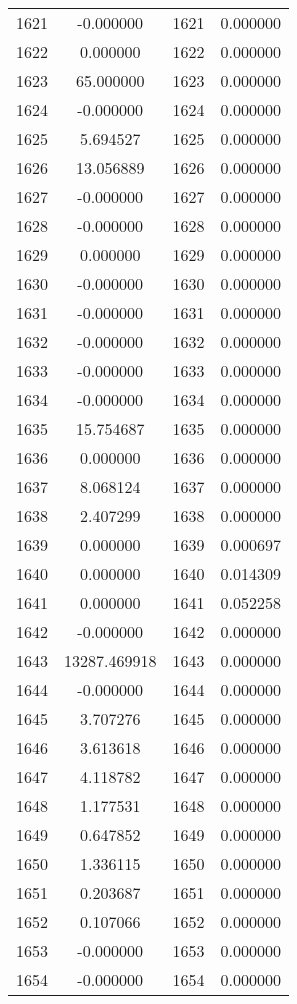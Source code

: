 \documentclass[12pt]{article}
\begin{document}
\begin{longtable}{@{}cccc@{}}
1621 & -0.000000 & 1621 & 0.000000 \\
1622 & 0.000000 & 1622 & 0.000000 \\
1623 & 65.000000 & 1623 & 0.000000 \\
1624 & -0.000000 & 1624 & 0.000000 \\
1625 & 5.694527 & 1625 & 0.000000 \\
1626 & 13.056889 & 1626 & 0.000000 \\
1627 & -0.000000 & 1627 & 0.000000 \\
1628 & -0.000000 & 1628 & 0.000000 \\
1629 & 0.000000 & 1629 & 0.000000 \\
1630 & -0.000000 & 1630 & 0.000000 \\
1631 & -0.000000 & 1631 & 0.000000 \\
1632 & -0.000000 & 1632 & 0.000000 \\
1633 & -0.000000 & 1633 & 0.000000 \\
1634 & -0.000000 & 1634 & 0.000000 \\
1635 & 15.754687 & 1635 & 0.000000 \\
1636 & 0.000000 & 1636 & 0.000000 \\
1637 & 8.068124 & 1637 & 0.000000 \\
1638 & 2.407299 & 1638 & 0.000000 \\
1639 & 0.000000 & 1639 & 0.000697 \\
1640 & 0.000000 & 1640 & 0.014309 \\
1641 & 0.000000 & 1641 & 0.052258 \\
1642 & -0.000000 & 1642 & 0.000000 \\
1643 & 13287.469918 & 1643 & 0.000000 \\
1644 & -0.000000 & 1644 & 0.000000 \\
1645 & 3.707276 & 1645 & 0.000000 \\
1646 & 3.613618 & 1646 & 0.000000 \\
1647 & 4.118782 & 1647 & 0.000000 \\
1648 & 1.177531 & 1648 & 0.000000 \\
1649 & 0.647852 & 1649 & 0.000000 \\
1650 & 1.336115 & 1650 & 0.000000 \\
1651 & 0.203687 & 1651 & 0.000000 \\
1652 & 0.107066 & 1652 & 0.000000 \\
1653 & -0.000000 & 1653 & 0.000000 \\
1654 & -0.000000 & 1654 & 0.000000 \\

\end{longtable}
\end{document}
